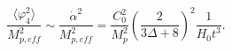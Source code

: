 \begin{equation}
\frac{\langle \varphi_4^2  \rangle}{M_{p,eff}^2} \sim 
\frac{\dot{\alpha}^2}{M_{p,eff}^2}=
\frac{C_0^2}{M_p^2} 
\left(\frac{2}{3 \Delta+8} \right)^2 \frac{1}{H_0 t^3}.
\end{equation}


